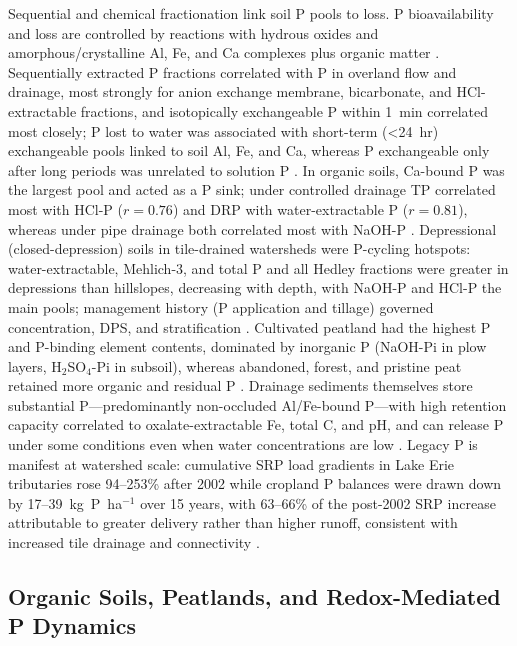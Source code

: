 Sequential and chemical fractionation link soil P pools to loss. P bioavailability and
loss are controlled by reactions with hydrous oxides and amorphous/crystalline Al, Fe,
and Ca complexes plus organic matter \parencite{Sharpley1995}. Sequentially extracted P
fractions correlated with P in overland flow and drainage, most strongly for anion
exchange membrane, bicarbonate, and HCl-extractable fractions, and isotopically
exchangeable P within 1~min correlated most closely; P lost to water was associated with
short-term (\textless24~hr) exchangeable pools linked to soil Al, Fe, and Ca, whereas P
exchangeable only after long periods was unrelated to solution P
\parencite{McDowell2001}. In organic soils, Ca-bound P was the largest pool and acted as a
P sink; under controlled drainage TP correlated most with HCl-P ($r=0.76$) and DRP with
water-extractable P ($r=0.81$), whereas under pipe drainage both correlated most with
NaOH-P \parencite{Grenon2022,Grenon2021}. Depressional (closed-depression) soils in
tile-drained watersheds were P-cycling hotspots: water-extractable, Mehlich-3, and total P
and all Hedley fractions were greater in depressions than hillslopes, decreasing with
depth, with NaOH-P and HCl-P the main pools; management history (P application and tillage)
governed concentration, DPS, and stratification \parencite{Mumbi2024}. Cultivated peatland
had the highest P and P-binding element contents, dominated by inorganic P (NaOH-Pi in plow
layers, H$_2$SO$_4$-Pi in subsoil), whereas abandoned, forest, and pristine peat retained
more organic and residual P \parencite{Höyhtyä2025}. Drainage sediments themselves store
substantial P---predominantly non-occluded Al/Fe-bound P---with high retention capacity
correlated to oxalate-extractable Fe, total C, and pH, and can release P under some
conditions even when water concentrations are low \parencite{Nguyen2002}. Legacy P is
manifest at watershed scale: cumulative SRP load gradients in Lake Erie tributaries rose
94--253\% after 2002 while cropland P balances were drawn down by 17--39~kg~P~ha$^{-1}$ over
15 years, with 63--66\% of the post-2002 SRP increase attributable to greater delivery
rather than higher runoff, consistent with increased tile drainage and connectivity
\parencite{Jarvie2017}.

\subsection{Organic Soils, Peatlands, and Redox-Mediated P Dynamics}

